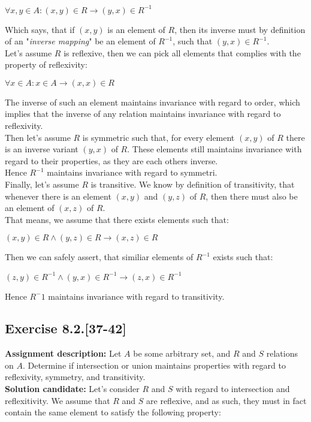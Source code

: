 \documentclass{report}
\newcommand{\cent}[1]{\begin{center}#1\end{center}}
\newcommand{\In}{\! \in \!}
\newcommand{\assignmentDescription}{\textbf{Assignment description: }}
\newcommand{\solution}{\textbf{Solution candidate: }}
\newcommand{\Exercise}[1]{\subsection{Exercise #1}}
\begin{document}
	\cent{$\forall x,y \In A : (x,y) \In R \to (y,x) \In R^{-1}$}
	
	Which says, that if  $(x,y)$ is an element of $R$, then its inverse must by definition of an "\textit{inverse mapping}" be an element of $R^{-1}$, such that $(y,x) \In R^{-1}$.\\
	
	Let's assume $R$ is reflexive, then we can pick all elements that complies with the property of reflexivity:
	
	\cent{$\forall x \In A : x \In A \to (x,x) \In R$}
	
	The inverse of such an element maintains invariance with regard to order, which implies that the inverse of any relation maintains invariance with regard to reflexivity.\\
	
	Then let's assume $R$ is symmetric such that, for every element $ (x,y) $ of $R$  there is an inverse variant $ (y,x) $ of $R$. These elements still maintains invariance with regard to their properties, as they are each others inverse.\\ 
	
	Hence $R^{-1}$ maintains invariance with regard to symmetri.\\
	
	Finally, let's assume $R$ is transitive. We know by definition of transitivity, that whenever there is an element $(x,y)$ and $ (y,z) $ of $R$, then there must also be an element of $(x,z)$ of $R$.\\
	
	That means, we assume that there exists elements such that:
	
	\cent{$ (x,y) \In R \wedge (y,z) \In R \to (x,z)\In R$}
	
	Then we can safely assert, that similiar elements of  $R^{-1}$ exists such that:
	
	\cent{$ (z,y) \In R^{-1} \wedge (y,x) \In R^{-1} \to (z,x)\In R^{-1}$}
	
	Hence $R^-1$ maintains invariance with regard to transitivity.
	
	\Exercise{8.2.[37-42]}
	
	\assignmentDescription
	Let $A$ be some arbitrary set, and $R$ and $S$ relations on $A$. Determine if intersection or union maintains properties with regard to reflexivity, symmetry, and transitivity.\\
	
	\solution
	Let's consider $R$ and $S$ with regard to intersection and reflexitivity. We assume that $R$ and $S$ are reflexive, and as such, they must in fact contain the same element to satisfy the following property:
	
\end{document}
